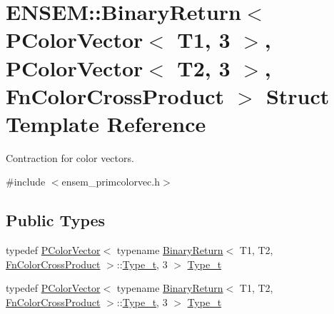 \hypertarget{structENSEM_1_1BinaryReturn_3_01PColorVector_3_01T1_00_013_01_4_00_01PColorVector_3_01T2_00_013_ba40478e41b9dc719d7fd5b6b54bac05}{}\section{E\+N\+S\+EM\+:\+:Binary\+Return$<$ P\+Color\+Vector$<$ T1, 3 $>$, P\+Color\+Vector$<$ T2, 3 $>$, Fn\+Color\+Cross\+Product $>$ Struct Template Reference}
\label{structENSEM_1_1BinaryReturn_3_01PColorVector_3_01T1_00_013_01_4_00_01PColorVector_3_01T2_00_013_ba40478e41b9dc719d7fd5b6b54bac05}


Contraction for color vectors.  




{\ttfamily \#include $<$ensem\+\_\+primcolorvec.\+h$>$}

\subsection*{Public Types}
\begin{DoxyCompactItemize}
\item 
typedef \mbox{\hyperlink{classENSEM_1_1PColorVector}{P\+Color\+Vector}}$<$ typename \mbox{\hyperlink{structENSEM_1_1BinaryReturn}{Binary\+Return}}$<$ T1, T2, \mbox{\hyperlink{structENSEM_1_1FnColorCrossProduct}{Fn\+Color\+Cross\+Product}} $>$\+::\mbox{\hyperlink{structENSEM_1_1BinaryReturn_3_01PColorVector_3_01T1_00_013_01_4_00_01PColorVector_3_01T2_00_013_ba40478e41b9dc719d7fd5b6b54bac05_a1ee2bf6b3057b787867e31a8bafe80a6}{Type\+\_\+t}}, 3 $>$ \mbox{\hyperlink{structENSEM_1_1BinaryReturn_3_01PColorVector_3_01T1_00_013_01_4_00_01PColorVector_3_01T2_00_013_ba40478e41b9dc719d7fd5b6b54bac05_a1ee2bf6b3057b787867e31a8bafe80a6}{Type\+\_\+t}}
\item 
typedef \mbox{\hyperlink{classENSEM_1_1PColorVector}{P\+Color\+Vector}}$<$ typename \mbox{\hyperlink{structENSEM_1_1BinaryReturn}{Binary\+Return}}$<$ T1, T2, \mbox{\hyperlink{structENSEM_1_1FnColorCrossProduct}{Fn\+Color\+Cross\+Product}} $>$\+::\mbox{\hyperlink{structENSEM_1_1BinaryReturn_3_01PColorVector_3_01T1_00_013_01_4_00_01PColorVector_3_01T2_00_013_ba40478e41b9dc719d7fd5b6b54bac05_a1ee2bf6b3057b787867e31a8bafe80a6}{Type\+\_\+t}}, 3 $>$ \mbox{\hyperlink{structENSEM_1_1BinaryReturn_3_01PColorVector_3_01T1_00_013_01_4_00_01PColorVector_3_01T2_00_013_ba40478e41b9dc719d7fd5b6b54bac05_a1ee2bf6b3057b787867e31a8bafe80a6}{Type\+\_\+t}}
\end{DoxyCompactItemize}


